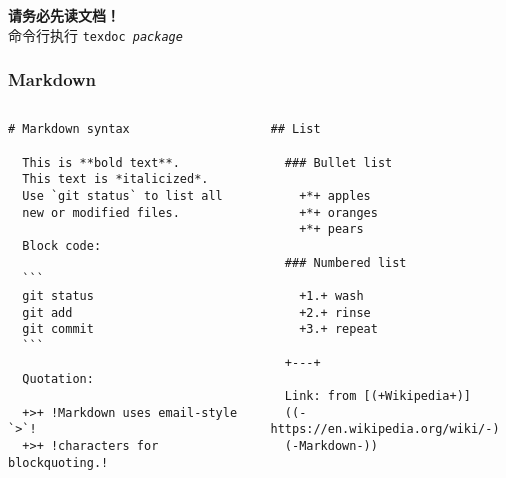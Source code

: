 \begin{frame}[standout]
  \huge \textbf{请务必先读文档！} \\[1ex]
  \footnotesize 命令行执行 \texttt{texdoc \textit{package}}
\end{frame}

\begin{frame}[fragile]
\frametitle{Markdown}
\begin{columns}
\begin{column}{0.5\textwidth}
  \begin{lstlisting}[gobble=2]
  # Markdown syntax

  This is **bold text**.
  This text is *italicized*.
  Use `git status` to list all
  new or modified files.

  Block code:

  ```
  git status
  git add
  git commit
  ```

  Quotation:

  +>+ !Markdown uses email-style `>`!
  +>+ !characters for blockquoting.!
  \end{lstlisting}
\end{column}
\begin{column}{0.5\textwidth}
  \begin{lstlisting}[gobble=2]
  ## List

  ### Bullet list

    +*+ apples
    +*+ oranges
    +*+ pears

  ### Numbered list

    +1.+ wash
    +2.+ rinse
    +3.+ repeat

  +---+

  Link: from [(+Wikipedia+)]
  ((-https://en.wikipedia.org/wiki/-)
  (-Markdown-))

  \end{lstlisting}
\end{column}
\end{columns}
\vspace{-0.6cm}
\end{frame}

